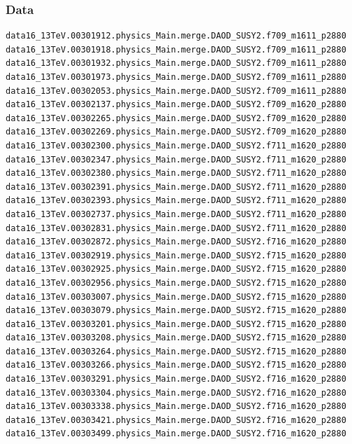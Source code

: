 \documentclass[mathserif,serif]{beamer}
\begin{document}
\begin{frame}[fragile]
\frametitle{Data}
\tiny
\begin{verbatim}
data16_13TeV.00301912.physics_Main.merge.DAOD_SUSY2.f709_m1611_p2880
data16_13TeV.00301918.physics_Main.merge.DAOD_SUSY2.f709_m1611_p2880
data16_13TeV.00301932.physics_Main.merge.DAOD_SUSY2.f709_m1611_p2880
data16_13TeV.00301973.physics_Main.merge.DAOD_SUSY2.f709_m1611_p2880
data16_13TeV.00302053.physics_Main.merge.DAOD_SUSY2.f709_m1611_p2880
data16_13TeV.00302137.physics_Main.merge.DAOD_SUSY2.f709_m1620_p2880
data16_13TeV.00302265.physics_Main.merge.DAOD_SUSY2.f709_m1620_p2880
data16_13TeV.00302269.physics_Main.merge.DAOD_SUSY2.f709_m1620_p2880
data16_13TeV.00302300.physics_Main.merge.DAOD_SUSY2.f711_m1620_p2880
data16_13TeV.00302347.physics_Main.merge.DAOD_SUSY2.f711_m1620_p2880
data16_13TeV.00302380.physics_Main.merge.DAOD_SUSY2.f711_m1620_p2880
data16_13TeV.00302391.physics_Main.merge.DAOD_SUSY2.f711_m1620_p2880
data16_13TeV.00302393.physics_Main.merge.DAOD_SUSY2.f711_m1620_p2880
data16_13TeV.00302737.physics_Main.merge.DAOD_SUSY2.f711_m1620_p2880
data16_13TeV.00302831.physics_Main.merge.DAOD_SUSY2.f711_m1620_p2880
data16_13TeV.00302872.physics_Main.merge.DAOD_SUSY2.f716_m1620_p2880
data16_13TeV.00302919.physics_Main.merge.DAOD_SUSY2.f715_m1620_p2880
data16_13TeV.00302925.physics_Main.merge.DAOD_SUSY2.f715_m1620_p2880
data16_13TeV.00302956.physics_Main.merge.DAOD_SUSY2.f715_m1620_p2880
data16_13TeV.00303007.physics_Main.merge.DAOD_SUSY2.f715_m1620_p2880
data16_13TeV.00303079.physics_Main.merge.DAOD_SUSY2.f715_m1620_p2880
data16_13TeV.00303201.physics_Main.merge.DAOD_SUSY2.f715_m1620_p2880
data16_13TeV.00303208.physics_Main.merge.DAOD_SUSY2.f715_m1620_p2880
data16_13TeV.00303264.physics_Main.merge.DAOD_SUSY2.f715_m1620_p2880
data16_13TeV.00303266.physics_Main.merge.DAOD_SUSY2.f715_m1620_p2880
data16_13TeV.00303291.physics_Main.merge.DAOD_SUSY2.f716_m1620_p2880
data16_13TeV.00303304.physics_Main.merge.DAOD_SUSY2.f716_m1620_p2880
data16_13TeV.00303338.physics_Main.merge.DAOD_SUSY2.f716_m1620_p2880
data16_13TeV.00303421.physics_Main.merge.DAOD_SUSY2.f716_m1620_p2880
data16_13TeV.00303499.physics_Main.merge.DAOD_SUSY2.f716_m1620_p2880
\end{verbatim}
\end{frame}
\end{document}
